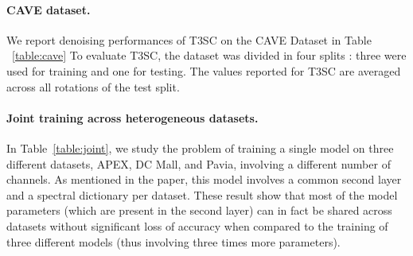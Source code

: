 \paragraph{CAVE dataset.}
We report denoising performances of T3SC on the CAVE Dataset in Table ~\ref{table:cave}
To evaluate T3SC, the dataset was divided in four splits : three were used for training and one for testing.
The values reported for T3SC are averaged across all rotations of the test split.
\begin{table}[H]
	\centering
	\label{table:cave}
\end{table}

\paragraph{Joint training across heterogeneous datasets.}
In Table~\ref{table:joint}, we study the problem of training a single model on
three different datasets, APEX, DC Mall, and Pavia, involving a different
number of channels. As mentioned in the paper, this model involves a common
second layer and a spectral dictionary per dataset. These result show that most
of the model parameters (which are present in the second layer) can in fact be shared
across datasets without significant loss of accuracy when compared to the training of
three different models (thus involving three times more parameters).

